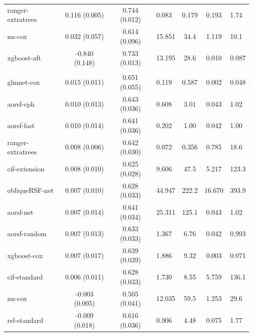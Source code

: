 \documentclass[twoside,11pt]{article}\usepackage[]{graphicx}\usepackage[]{xcolor}
\newenvironment{knitrout}{}{} %
\begin{document}
\begin{knitrout}
\begin{longtable}{lcclccl}
\hspace{1em}ranger-extratrees & 0.116 (0.005) & 0.744 (0.012) & 0.083 & 0.179 & 0.193 & 1.74\\
\hspace{1em}nn-cox & 0.032 (0.057) & 0.614 (0.096) & 15.851 & 34.4 & 1.119 & 10.1\\
\hspace{1em}xgboost-aft & -0.840 (0.148) & 0.733 (0.013) & 13.195 & 28.6 & 0.010 & 0.087\\
\addlinespace[0.3em]
\hline
\multicolumn{7}{l}{\textit{\textbf{Monoclonal gammopathy; malignancy, n = 1384, p = 8}}}\\
\hline
\hspace{1em}glmnet-cox & 0.015 (0.011) & 0.651 (0.055) & 0.119 & 0.587 & 0.002 & 0.048\\
\hspace{1em}aorsf-cph & 0.010 (0.013) & 0.643 (0.036) & 0.608 & 3.01 & 0.043 & 1.02\\
\hspace{1em}aorsf-fast & 0.010 (0.014) & 0.641 (0.036) & 0.202 & 1.00 & 0.042 & 1.00\\
\hspace{1em}ranger-extratrees & 0.008 (0.006) & 0.642 (0.030) & 0.072 & 0.356 & 0.785 & 18.6\\
\hspace{1em}cif-extension & 0.008 (0.010) & 0.625 (0.028) & 9.606 & 47.5 & 5.217 & 123.3\\
\hspace{1em}obliqueRSF-net & 0.007 (0.010) & 0.628 (0.033) & 44.947 & 222.2 & 16.670 & 393.9\\
\hspace{1em}aorsf-net & 0.007 (0.014) & 0.641 (0.034) & 25.311 & 125.1 & 0.043 & 1.02\\
\hspace{1em}aorsf-random & 0.007 (0.013) & 0.633 (0.033) & 1.367 & 6.76 & 0.042 & 0.993\\
\hspace{1em}xgboost-cox & 0.007 (0.017) & 0.639 (0.039) & 1.886 & 9.32 & 0.003 & 0.071\\
\hspace{1em}cif-standard & 0.006 (0.011) & 0.628 (0.033) & 1.730 & 8.55 & 5.759 & 136.1\\
\hspace{1em}nn-cox & -0.003 (0.005) & 0.505 (0.041) & 12.035 & 59.5 & 1.253 & 29.6\\
\hspace{1em}rsf-standard & -0.009 (0.018) & 0.616 (0.036) & 0.906 & 4.48 & 0.075 & 1.77\\

\end{longtable}
\end{knitrout}
\end{document}
